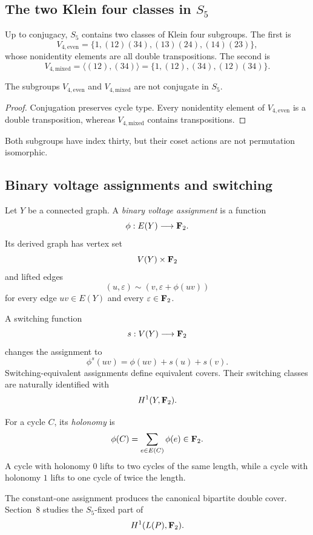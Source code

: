 \subsection{The two Klein four classes in \(S_5\)}

Up to conjugacy, \(S_5\) contains two classes of Klein four subgroups. The
first is
\[
V_{4,\mathrm{even}}
=
\{
1,
(12)(34),
(13)(24),
(14)(23)
\},
\]
whose nonidentity elements are all double transpositions. The second is
\[
V_{4,\mathrm{mixed}}
=
\langle(12),(34)\rangle
=
\{
1,
(12),
(34),
(12)(34)
\}.
\]

\begin{proposition}
The subgroups \(V_{4,\mathrm{even}}\) and
\(V_{4,\mathrm{mixed}}\) are not conjugate in \(S_5\).
\end{proposition}

\begin{proof}
Conjugation preserves cycle type. Every nonidentity element of
\(V_{4,\mathrm{even}}\) is a double transposition, whereas
\(V_{4,\mathrm{mixed}}\) contains transpositions.
\end{proof}

Both subgroups have index thirty, but their coset actions are not
permutation isomorphic.

\subsection{Binary voltage assignments and switching}

Let \(Y\) be a connected graph. A \emph{binary voltage assignment} is a
function
\[
\phi:E(Y)\longrightarrow\mathbf F_2.
\]
Its derived graph has vertex set
\[
V(Y)\times\mathbf F_2
\]
and lifted edges
\[
(u,\varepsilon)
\sim
(v,\varepsilon+\phi(uv))
\]
for every edge \(uv\in E(Y)\) and every \(\varepsilon\in\mathbf F_2\).

A switching function
\[
s:V(Y)\longrightarrow\mathbf F_2
\]
changes the assignment to
\[
\phi^{s}(uv)
=
\phi(uv)+s(u)+s(v).
\]
Switching-equivalent assignments define equivalent covers. Their switching
classes are naturally identified with
\[
H^1(Y,\mathbf F_2).
\]

For a cycle \(C\), its \emph{holonomy} is
\[
\phi(C)
=
\sum_{e\in E(C)}\phi(e)
\in\mathbf F_2.
\]
A cycle with holonomy \(0\) lifts to two cycles of the same length, while a
cycle with holonomy \(1\) lifts to one cycle of twice the length.

The constant-one assignment produces the canonical bipartite double cover.
Section~8 studies the \(S_5\)-fixed part of
\[
H^1(L(P),\mathbf F_2).
\]

